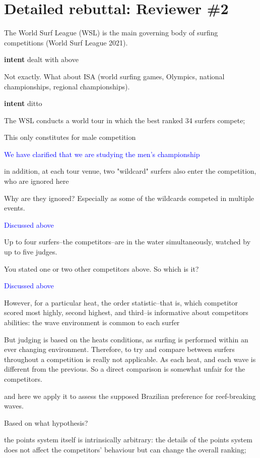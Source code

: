 \documentclass[12pt]{article}
\begin{document}
\section*{Detailed rebuttal: Reviewer \#2}


The World Surf League (WSL) is the main governing
body of surfing competitions (World Surf League 2021).

{\bf intent}  dealt with above

Not exactly. What about ISA (world surfing games, Olympics, national
championships, regional championships).

{\bf intent}  ditto


The WSL conducts a
world tour in which the best ranked 34 surfers compete;

This only constitutes for male competition

\textcolor{blue}{We have clarified that we are studying the men's
  championship}

in addition, at each tour venue, two "wildcard" surfers also enter the
competition, who are ignored here

Why are they ignored? Especially as some of the wildcards competed in multiple events.

\textcolor{blue}{Discussed above}


Up to four surfers--the competitors--are in the water simultaneously,
watched by up to five judges.

You stated one or two other competitors above. So which is it?

\textcolor{blue}{Discussed above}


However, for a particular heat, the order statistic--that is, which
competitor scored most highly, second highest, and third--is
informative about competitors abilities: the wave environment is
common to each surfer

But judging is based on the heats conditions, as surfing is performed
within an ever changing environment. Therefore, to try and compare
between surfers throughout a competition is really not applicable. As
each heat, and each wave is different from the previous. So a direct
comparison is somewhat unfair for the competitors.



and here we apply it to assess the supposed Brazilian preference for
reef-breaking waves.

Based on what hypothesis?


the points system itself is intrinsically arbitrary: the details of
the points system does not affect the competitors' behaviour but can
change the overall ranking;
\end{document}
